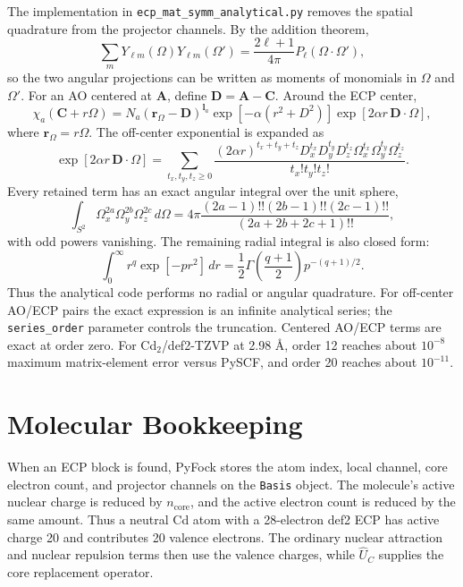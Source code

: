 \documentclass[11pt]{article}
\begin{document}
The implementation in \texttt{ecp\_mat\_symm\_analytical.py} removes the
spatial quadrature from the projector channels. By the addition theorem,
\begin{equation}
  \sum_m Y_{\ell m}(\Omega)Y_{\ell m}(\Omega')
  =
  \frac{2\ell+1}{4\pi}P_\ell(\Omega\cdot\Omega'),
\end{equation}
so the two angular projections can be written as moments of monomials in
\(\Omega\) and \(\Omega'\). For an AO centered at \(\mathbf A\), define
\(\mathbf D=\mathbf A-\mathbf C\). Around the ECP center,
\begin{equation}
  \chi_a(\mathbf C+r\Omega)
  =
  N_a (\mathbf r_\Omega-\mathbf D)^{\mathbf l_a}
  \exp[-\alpha(r^2+D^2)]
  \exp[2\alpha r\,\mathbf D\cdot\Omega],
\end{equation}
where \(\mathbf r_\Omega=r\Omega\). The off-center exponential is expanded as
\begin{equation}
  \exp[2\alpha r\,\mathbf D\cdot\Omega]
  =
  \sum_{t_x,t_y,t_z\ge 0}
  \frac{(2\alpha r)^{t_x+t_y+t_z}
  D_x^{t_x}D_y^{t_y}D_z^{t_z}
  \Omega_x^{t_x}\Omega_y^{t_y}\Omega_z^{t_z}}
  {t_x!t_y!t_z!}.
\end{equation}
Every retained term has an exact angular integral over the unit sphere,
\begin{equation}
  \int_{S^2}\Omega_x^{2a}\Omega_y^{2b}\Omega_z^{2c}\,d\Omega
  =
  4\pi
  \frac{(2a-1)!!(2b-1)!!(2c-1)!!}
       {(2a+2b+2c+1)!!},
\end{equation}
with odd powers vanishing. The remaining radial integral is also closed form:
\begin{equation}
  \int_0^\infty r^q \exp[-p r^2]\,dr
  =
  \frac{1}{2}\Gamma\left(\frac{q+1}{2}\right)
  p^{-(q+1)/2}.
\end{equation}
Thus the analytical code performs no radial or angular quadrature. For
off-center AO/ECP pairs the exact expression is an infinite analytical series;
the \texttt{series\_order} parameter controls the truncation. Centered
AO/ECP terms are exact at order zero. For Cd\(_2\)/def2-TZVP at 2.98
\AA, order 12 reaches about \(10^{-8}\) maximum matrix-element error versus
PySCF, and order 20 reaches about \(10^{-11}\).

\section{Molecular Bookkeeping}

When an ECP block is found, PyFock stores the atom index, local channel, core
electron count, and projector channels on the \texttt{Basis} object. The
molecule's active nuclear charge is reduced by \(n_{\mathrm{core}}\), and the
active electron count is reduced by the same amount. Thus a neutral Cd atom with
a 28-electron def2 ECP has active charge 20 and contributes 20 valence
electrons. The ordinary nuclear attraction and nuclear repulsion terms then use
the valence charges, while \(\hat U_C\) supplies the core replacement operator.
\end{document}
